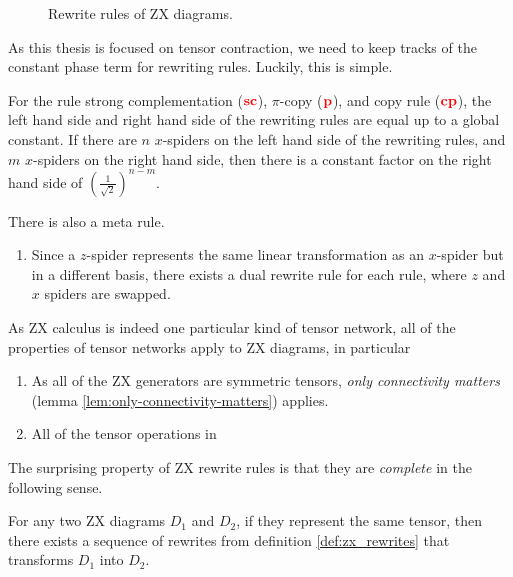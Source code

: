 \begin{definition}
\begin{figure}[ht]
	\centering
	\resizebox{\linewidth}{!}{
		
	}
	\caption{Rewrite rules of ZX diagrams. }
	\label{fig:zx_rewrites}
\end{figure}

As this thesis is focused on tensor contraction, we need to keep tracks of the constant phase term for rewriting rules. 
Luckily, this is simple.

\begin{lemma}
	For the rule strong complementation ($\color{red} \mathbf{sc}$), $\pi$-copy ($\color{red} \mathbf{p}$), and copy rule ($\color{red} \mathbf{cp}$), the left hand side and right hand side of the rewriting rules are equal up to a global constant.
	If there are $n$ $x$-spiders on the left hand side of the rewriting rules, and $m$ $x$-spiders on the right hand side, then there is a constant factor on the right hand side of $(\frac{1}{\sqrt{2}})^{n-m}$.
\end{lemma}

There is also a meta rule.
\begin{enumerate}
	\item Since a $z$-spider represents the same linear transformation as an $x$-spider but in a different basis, there exists a dual rewrite rule for each rule, where $z$ and $x$ spiders are swapped. 
\end{enumerate}

As ZX calculus is indeed one particular kind of tensor network, all of the properties of tensor networks apply to ZX diagrams, in particular
\begin{enumerate}
	\item As all of the ZX generators are symmetric tensors, \emph{only connectivity matters} (lemma \ref{lem:only-connectivity-matters}) applies.
	\item All of the tensor operations in
\end{enumerate}
\end{definition}\label{def:zx_rewrites}


The surprising property of ZX rewrite rules is that they are \emph{complete} in the following sense. 

\begin{theorem}
	For any two ZX diagrams $D_1$ and $D_2$, if they represent the same tensor, then there exists a sequence of rewrites from definition \ref{def:zx_rewrites} that transforms $D_1$ into $D_2$.
\end{theorem}

